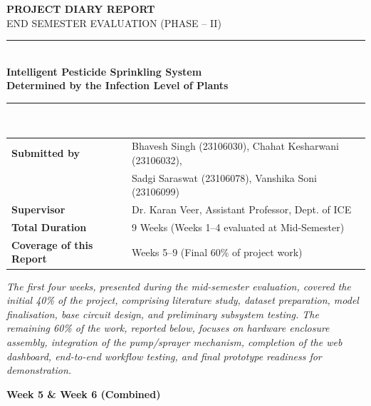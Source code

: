 \documentclass[12pt,a4paper,oneside]{report}
\newcommand{\HRule}{\rule{\linewidth}{0.5mm}}
\begin{document}
\pagestyle{empty}

\begin{center}
\vspace*{0.4cm}
{\large \textbf{PROJECT DIARY REPORT}}\\[0.2cm]
{\normalsize END SEMESTER EVALUATION (PHASE -- II)}\\[0.5cm]
\HRule\\[0.25cm]
{\large \textbf{Intelligent Pesticide Sprinkling System\\
Determined by the Infection Level of Plants}}\\[0.25cm]
\HRule\\[0.6cm]
\end{center}

\renewcommand{\arraystretch}{1.3}
\noindent\begin{tabularx}{\textwidth}{p{4.2cm}X}
\textbf{Submitted by} & Bhavesh Singh (23106030), Chahat Kesharwani (23106032), \\
 & Sadgi Saraswat (23106078), Vanshika Soni (23106099) \\[0.2cm]
\textbf{Supervisor} & Dr. Karan Veer, Assistant Professor, Dept. of ICE \\[0.2cm]
\textbf{Total Duration} & 9 Weeks (Weeks 1--4 evaluated at Mid-Semester) \\[0.2cm]
\textbf{Coverage of this Report} & Weeks 5--9 (Final 60\% of project work) \\
\end{tabularx}

\vspace{0.4cm}
\noindent\textit{The first four weeks, presented during the mid-semester evaluation, covered the
initial 40\% of the project, comprising literature study, dataset preparation, model
finalisation, base circuit design, and preliminary subsystem testing. The remaining 60\% of the
work, reported below, focuses on hardware enclosure assembly, integration of the pump/sprayer
mechanism, completion of the web dashboard, end-to-end workflow testing, and final prototype
readiness for demonstration.}

\vspace{0.6cm}

\noindent\textbf{\large Week 5 \& Week 6 (Combined)}
\vspace{0.2cm}
\end{document}
